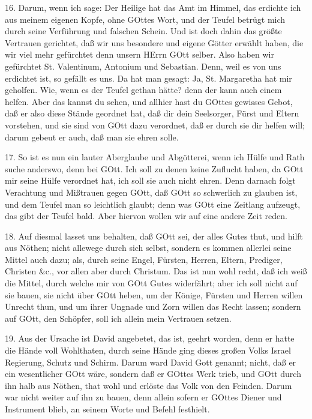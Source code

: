 16. Darum, wenn ich sage: Der Heilige hat das Amt im Himmel, das erdichte ich aus meinem eigenen Kopfe, ohne GOttes Wort, und der Teufel betrügt mich durch seine Verführung und falschen Schein. Und ist doch dahin das größte Vertrauen gerichtet, daß wir uns besondere und eigene Götter erwählt haben, die wir viel mehr gefürchtet denn unsern HErrn GOtt selber. Also haben wir gefürchtet St. Valentinum, Antonium und Sebastian. Denn, weil es von uns erdichtet ist, so gefällt es uns. Da hat man gesagt: Ja, St. Margaretha hat mir geholfen. Wie, wenn es der Teufel gethan hätte? denn der kann auch einem helfen. Aber das kannst du sehen, und allhier hast du GOttes gewisses Gebot, daß er also diese Stände geordnet hat, daß dir dein Seelsorger, Fürst und Eltern vorstehen, und sie sind von GOtt dazu verordnet, daß er durch sie dir helfen will; darum gebeut er auch, daß man sie ehren solle.

17. So ist es nun ein lauter Aberglaube und Abgötterei, wenn ich Hülfe und Rath suche anderswo, denn bei GOtt. Ich soll zu denen keine Zuflucht haben, da GOtt mir seine Hülfe verordnet hat, ich soll sie auch nicht ehren. Denn darnach folgt Verachtung und Mißtrauen gegen GOtt, daß GOtt so schwerlich zu glauben ist, und dem Teufel man so leichtlich glaubt; denn was GOtt eine Zeitlang aufzeugt, das gibt der Teufel bald. Aber hiervon wollen wir auf eine andere Zeit reden.

18. Auf diesmal lasset uns behalten, daß GOtt sei, der alles Gutes thut, und hilft aus Nöthen; nicht allewege durch sich selbst, sondern es kommen allerlei seine Mittel auch dazu; als, durch seine Engel, Fürsten, Herren, Eltern, Prediger, Christen \&c., vor allen aber durch Christum. Das ist nun wohl recht, daß ich weiß die Mittel, durch welche mir von GOtt Gutes widerfährt; aber ich soll nicht auf sie bauen, sie nicht über GOtt heben, um der Könige, Fürsten und Herren willen Unrecht thun, und um ihrer Ungnade und Zorn willen das Recht lassen; sondern auf GOtt, den Schöpfer, soll ich allein mein Vertrauen setzen.

19. Aus der Ursache ist David angebetet, das ist, geehrt worden, denn er hatte die Hände voll Wohlthaten, durch seine Hände ging dieses großen Volks Israel Regierung, Schutz und Schirm. Darum ward David Gott genannt; nicht, daß er ein wesentlicher GOtt wäre, sondern daß er GOttes Werk trieb, und GOtt durch ihn halb aus Nöthen, that wohl und erlöste das Volk von den Feinden. Darum war nicht weiter auf ihn zu bauen, denn allein sofern er GOttes Diener und Instrument blieb, an seinem Worte und Befehl festhielt.

